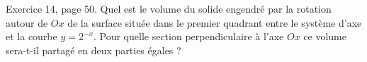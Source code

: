 \begin{exercice}\label{exoGeneral0026}

Exercice 14, page 50. Quel est le volume du solide engendré par la rotation autour de $Ox$ de la surface située dans le premier quadrant entre le système d'axe et la courbe $y=2^{-x}$. Pour quelle section perpendiculaire à l'axe $Ox$ ce volume sera-t-il partagé en deux parties égales ?

\end{exercice}
